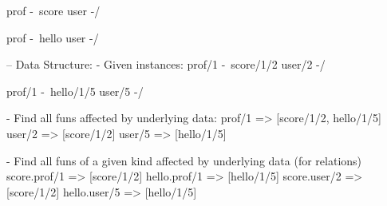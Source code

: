 prof -\
       score
user -/

prof -\
       hello
user -/

-- Data Structure:
- Given instances:
prof/1 -\
         score/1/2
user/2 -/

prof/1 -\
         hello/1/5
user/5 -/

- Find all funs affected by underlying data:
prof/1 => [score/1/2, hello/1/5]
user/2 => [score/1/2]
user/5 => [hello/1/5]

- Find all funs of a given kind affected by underlying data (for relations)
score.prof/1 => [score/1/2]
hello.prof/1 => [hello/1/5]
score.user/2 => [score/1/2]
hello.user/5 => [hello/1/5]


